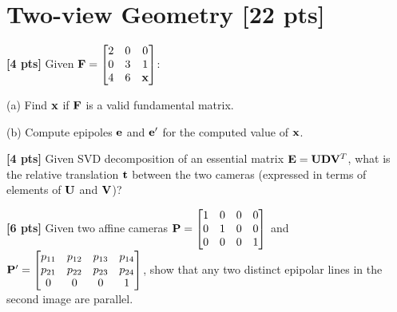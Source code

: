 \section{Two-view Geometry  [22 pts]}
\begin{questions}

    \question \textbf{[4 pts]} Given $\mathbf{F} = \begin{bmatrix}
            2 & 0 & 0   \\
            0 & 3 & 1   \\
            4 & 6 & \mathbf{x}
        \end{bmatrix}$:

    (a) Find $\mathbf{x}$ if $\mathbf{F}$ is a valid fundamental matrix.

    \begin{tcolorbox}[fit,height=4.5cm, width=\textwidth, blank, borderline={0.5pt}{-2pt},halign=left, valign=center, nobeforeafter]
    \end{tcolorbox}

    (b) Compute epipoles $\mathbf{e}$ and $\mathbf{e}'$ for the computed value of $\mathbf{x}$.

    \begin{tcolorbox}[fit,height=4.5cm, width=\textwidth, blank, borderline={0.5pt}{-2pt},halign=left, valign=center, nobeforeafter]
    \end{tcolorbox}

    \question \textbf{[4 pts]} Given SVD decomposition of an essential matrix $\mathbf{E} = \mathbf{U}\mathbf{D}\mathbf{V}^T$, what is the relative translation $\mathbf{t}$ between the two cameras (expressed in terms of elements of $\mathbf{U}$  and $\mathbf{V}$)?

    \begin{tcolorbox}[fit,height=4.5cm, width=\textwidth, blank, borderline={0.5pt}{-2pt},halign=left, valign=center, nobeforeafter]


    \end{tcolorbox}
    \clearpage

    \question \textbf{[6 pts]} Given two affine cameras $\mathbf{P} = \begin{bmatrix}
            1 & 0 & 0 & 0 \\
            0 & 1 & 0 & 0 \\
            0 & 0 & 0 & 1
        \end{bmatrix}$ and $\mathbf{P}' = \begin{bmatrix}
            p_{11} & p_{12} & p_{13} & p_{14} \\
            p_{21} & p_{22} & p_{23} & p_{24} \\
            0      & 0      & 0      & 1
        \end{bmatrix}$, show that any two distinct epipolar lines in the second image are parallel.


\end{questions}
